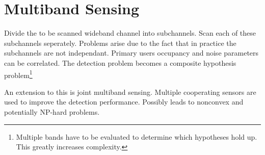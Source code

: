 \section{Multiband Sensing}
Divide the to be scanned wideband channel into subchannels. Scan each of these subchannels seperately. Problems arise due to the fact that in practice the subchannels are not independant. Primary users occupancy and noise parameters can be correlated. The detection problem becomes a composite hypothesis problem\footnote{Multiple bands have to be evaluated to determine which hypotheses hold up. This greatly increases complexity.}

An extension to this is joint multiband sensing. Multiple cooperating sensors are used to improve the detection performance. Possibly leads to nonconvex and potentially NP-hard problems.
